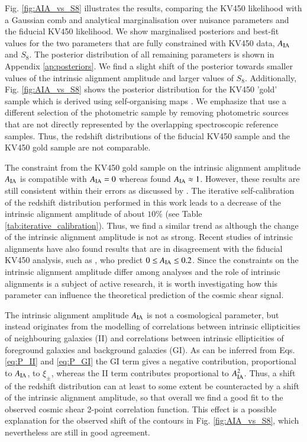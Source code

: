 \documentclass{aa}
\begin{document}
Fig. \ref{fig:AIA_vs_S8} illustrates the results, comparing the KV450 likelihood with a Gaussian comb and analytical marginalisation over nuisance parameters and the fiducial KV450 likelihood. We show marginalised posteriors and best-fit values for the two parameters that are fully constrained with KV450 data, $A_{\rm IA}$ and $S_8$. The posterior distribution of all remaining parameters is shown in Appendix \ref{ap:posteriors}. We find a slight shift of the posterior towards smaller values of the intrinsic alignment amplitude and larger values of $S_8$. Additionally, Fig. \ref{fig:AIA_vs_S8} shows the posterior distribution for the KV450 'gold' sample which is derived using self-organising maps \citep{wright_som_kv450}. We emphasize that \cite{wright_som_kv450} use a different selection of the photometric sample by removing photometric sources that are not directly represented by the overlapping spectroscopic reference samples. Thus, the redshift distributions of the fiducial KV450 sample and the KV450 gold sample are not comparable. 

The constraint from the KV450 gold sample on the intrinsic alignment amplitude $A_{\rm IA}$ is compatible with $A_{\rm IA} = 0$ whereas \cite{hildebrandt18} found $A_{\rm IA} \approx 1$. However, these results are still consistent within their errors as discussed by \cite{wright_som_kv450}. The iterative self-calibration of the redshift distribution performed in this work leads to a decrease of the intrinsic alignment amplitude of about $10\%$ (see Table \ref{tab:iterative_calibration}). Thus, we find a similar trend as \cite{wright_som_kv450} although the change of the intrinsic alignment amplitude is not as strong. Recent studies of intrinsic alignments have also found results that are in disagreement with the fiducial KV450 analysis, such as \cite{fortuna20}, who predict $0 \leq A_{\rm IA} \leq 0.2$. Since the constraints on the intrinsic alignment amplitude differ among analyses and the role of intrinsic alignments is a subject of active research, it is worth investigating how this parameter can influence the theoretical prediction of the cosmic shear signal.

The intrinsic alignment amplitude $A_{\rm IA}$ is not a cosmological parameter, but instead originates from the modelling of correlations between intrinsic ellipticities of neighbouring galaxies (II) and correlations between intrinsic ellipticities of foreground galaxies and background galaxies (GI). As can be inferred from Eqs. \eqref{eq:P_II} and \eqref{eq:P_GI} the GI term gives a negative contribution, proportional to $A_{\rm IA}$, to $\xi_\pm$, whereas the II term contributes proportional to $A_{\rm IA}^2$. Thus, a shift of the redshift distribution can at least to some extent be counteracted by a shift of the intrinsic alignment amplitude, so that overall we find a good fit to the observed cosmic shear 2-point correlation function. This effect is a possible explanation for the observed shift of the contours in Fig. \ref{fig:AIA_vs_S8}, which nevertheless are still in good agreement. 
\end{document}
